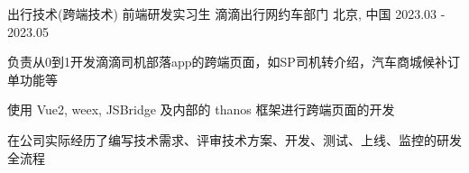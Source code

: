 

\begin{cventries}

    \cventry
    {出行技术(跨端技术) \hspace{1mm} 前端研发实习生} %
    {滴滴出行\hspace{1mm}网约车部门} %
    {北京, 中国} %
    {2023.03 - 2023.05} %
    {
        \begin{cvitems} %
            \item {负责从0到1开发滴滴司机部落app的跨端页面，如SP司机转介绍，汽车商城候补订单功能等}
            \item {使用 Vue2, weex, JSBridge 及内部的 thanos 框架进行跨端页面的开发}
            \item {在公司实际经历了编写技术需求、评审技术方案、开发、测试、上线、监控的研发全流程}
        \end{cvitems}
    }

\end{cventries}
